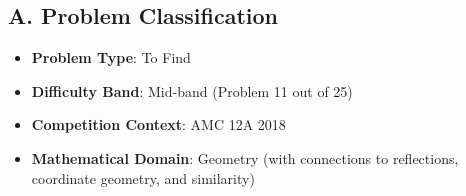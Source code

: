 \documentclass[12pt]{article}
\begin{document}
\begin{problemconfigbox}
\subsection*{A. Problem Classification}
\begin{itemize}[leftmargin=*]
    \item \textbf{Problem Type}: To Find
    \item \textbf{Difficulty Band}: Mid-band (Problem 11 out of 25)
    \item \textbf{Competition Context}: AMC 12A 2018
    \item \textbf{Mathematical Domain}: Geometry (with connections to reflections, coordinate geometry, and similarity)
\end{itemize}


\end{problemconfigbox}
\end{document}
